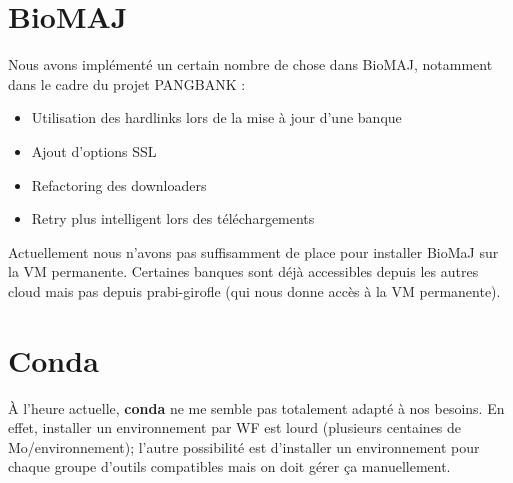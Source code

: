 \section{BioMAJ}

Nous avons implémenté un certain nombre de chose dans BioMAJ, notamment dans le cadre du projet PANGBANK :
\begin{itemize}
    \item Utilisation des hardlinks lors de la mise à jour d'une banque
    \item Ajout d'options SSL
    \item Refactoring des downloaders
    \item Retry plus intelligent lors des téléchargements
\end{itemize}
Actuellement nous n'avons pas suffisamment de place pour installer BioMaJ sur la VM permanente.
Certaines banques sont déjà accessibles depuis les autres cloud mais pas depuis prabi-girofle (qui nous donne accès à la VM permanente).

\section{Conda}
À l'heure actuelle, \textbf{conda} ne me semble pas totalement adapté à nos besoins.
En effet, installer un environnement par WF est lourd (plusieurs centaines de Mo/environnement); l'autre possibilité est d'installer un environnement pour chaque groupe d'outils compatibles mais on doit gérer ça manuellement.
